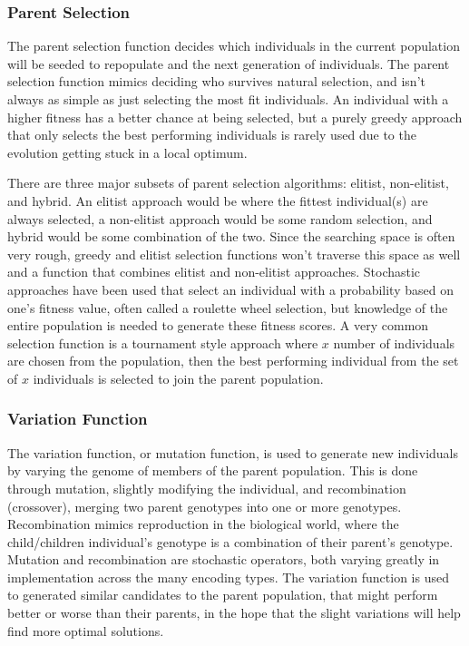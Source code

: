 \documentclass[conference]{IEEEtran}
\begin{document}
{\subsubsection{Parent Selection}
\label{ea:parent_selection}
\par The parent selection function decides which individuals in the current population will be seeded to repopulate and the next generation of individuals. 
The parent selection function mimics deciding who survives natural selection, and isn't always as simple as just selecting the most fit individuals. 
An individual with a higher fitness has a better chance at being selected, but a purely greedy approach that only selects the best performing individuals is rarely used due to the evolution getting stuck in a local optimum.

\par There are three major subsets of parent selection algorithms: elitist, non-elitist, and hybrid. 
An elitist approach would be where the fittest individual(s) are always selected, a non-elitist approach would be some random selection, and hybrid would be some combination of the two. 
Since the searching space is often very rough, greedy and elitist selection functions won't traverse this space as well and a function that combines elitist and non-elitist approaches\cite{eiben2003introduction}.
Stochastic approaches have been used that select an individual with a probability based on one's fitness value, often called a roulette wheel selection, but knowledge of the entire population is needed to generate these fitness scores.
A very common selection function is a tournament style approach where $x$ number of individuals are chosen from the population, then the best performing individual from the set of $x$ individuals is selected to join the parent population. 

\subsubsection{Variation Function}
\label{ea:variation}
\par The variation function, or mutation function, is used to generate new individuals by varying the genome of members of the parent population. 
This is done through mutation, slightly modifying the individual, and recombination (crossover), merging two parent genotypes into one or more genotypes. 
Recombination mimics reproduction in the biological world, where the child/children individual's genotype is a combination of their parent's genotype.
Mutation and recombination are stochastic operators, both varying greatly in implementation across the many encoding types.
The variation function is used to generated similar candidates to the parent population, that might perform better or worse than their parents, in the hope that the slight variations will help find more optimal solutions.

}
\end{document}
